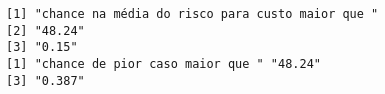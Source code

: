 \documentclass[11pt]{article}
\begin{document}
    \begin{Verbatim}[commandchars=\\\{\}]
[1] "chance na média do risco para custo maior que "
[2] "48.24"                                         
[3] "0.15"                                          
[1] "chance de pior caso maior que " "48.24"                         
[3] "0.387"                         

    \end{Verbatim}


    
    
    
    
\end{document}
